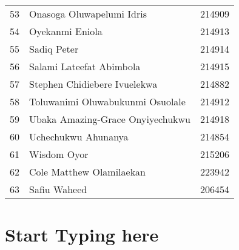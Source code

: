 \documentclass[a4paper]{article}
\begin{document}
\begin{center}
\begin{longtable} { c|l|c }
            53 & Onasoga Oluwapelumi Idris & 214909\\
            54 & Oyekanmi Eniola & 214913\\
            55 & Sadiq Peter & 214914\\
            56 & Salami Lateefat Abimbola & 214915\\
            57 & Stephen Chidiebere Ivuelekwa & 214882\\
            58 & Toluwanimi Oluwabukunmi Osuolale & 214912\\
            59 & Ubaka Amazing-Grace Onyiyechukwu & 214918\\
            60 & Uchechukwu Ahunanya & 214854\\
            61 & Wisdom Oyor & 215206\\
            62 & Cole Matthew Olamilaekan & 223942\\
            63 & Safiu Waheed & 206454\\
            \bottomrule[4pt]
        \end{longtable}
        \normalsize
    \end{center}

    \newpage
    \section{Start Typing here}
\end{document}
